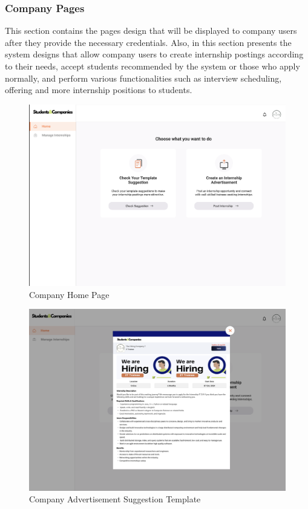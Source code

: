\documentclass[a4paper,12pt]{article}
\begin{document}
\subsubsection*{Company Pages}
This section contains the pages design that will be displayed to company users after they provide the necessary credentials. Also, in this section presents the system designs that allow company users to create internship postings according to their needs, accept students recommended by the system or those who apply normally, and perform various functionalities such as interview scheduling, offering and more internship positions to students.
\begin{figure}[H]
    \centering
    \includegraphics[scale = 0.42]{figures/UserInterfaces/Company/CompanyHome.png}
    \caption{Company Home Page}
     \centering
\end{figure}
\begin{figure}[H]
    \centering
    \includegraphics[scale = 0.40]{figures/UserInterfaces/Company/CompanySuggestion.png}
    \caption{Company Advertisement Suggestion Template}
     \centering
\end{figure}
\end{document}
